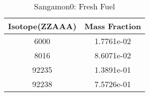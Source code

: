 \begin{table}[h!]
\centering
\begin{tabular}{|| c || c |}
\hline
Isotope(ZZAAA) & Mass Fraction \\
\hline \hline

6000 & 1.7761e-02 \\
8016 & 8.6071e-02 \\
92235 & 1.3891e-01 \\
92238 & 7.5726e-01 \\

\hline
\end{tabular}
\caption{Sangamon0: Fresh Fuel}
\label{table:sang0ffuel}
\end{table}